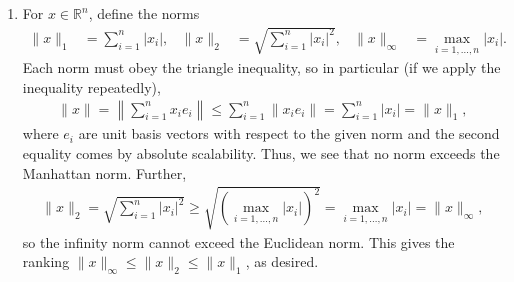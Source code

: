 \documentclass[11pt,letterpaper]{article}
\numberwithin{equation}{section}
\numberwithin{figure}{section}
\begin{document}
\begin{enumerate}
	\item For $x \in \mathbb{R}^n$, define the norms
	\begin{align*}
		\|x\|_1 &= \sum_{i=1}^n |x_i|,&
		\|x\|_2 &= \sqrt{\sum_{i=1}^n |x_i|^2},&
		\|x\|_\infty &= \max_{i=1,\ldots,n} |x_i|.
	\end{align*}
	Each norm must obey the triangle inequality, so in particular (if we apply the inequality repeatedly),
	\begin{align*}
		\|x\| = \left\|\sum_{i=1}^n x_i e_i\right\| \leq \sum_{i=1}^n \|x_i e_i\| = \sum_{i=1}^n |x_i| = \|x\|_1,
	\end{align*}
	where $e_i$ are unit basis vectors with respect to the given norm and the second equality comes by absolute scalability. Thus, we see that no norm exceeds the Manhattan norm. Further,
	\begin{align*}
		\|x\|_2 = \sqrt{\sum_{i=1}^n |x_i|^2} \geq \sqrt{(\max_{i=1,\ldots,n} |x_i|)^2} = \max_{i=1,\ldots,n} |x_i| = \|x\|_\infty,
	\end{align*}
	so the infinity norm cannot exceed the Euclidean norm. This gives the ranking \mbox{$\|x\|_\infty \leq \|x\|_2 \leq \|x\|_1$}, as desired.






\end{enumerate}
\end{document}
